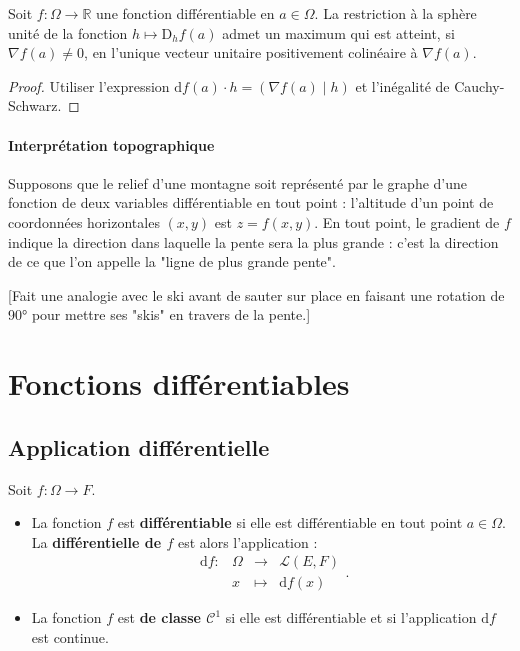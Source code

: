 \documentclass[french]{article}
\newcommand{\R}{\mathbb{R}}
\renewcommand{\d}{\text{d}}
\newcommand{\D}{\text{D}}
\theoremstyle{plain}
\theoremstyle{definition}
\theoremstyle{remark}
\begin{document}
\begin{prop}%
	Soit $f:\Omega\to\R$ une fonction différentiable en $a\in\Omega$. La restriction à la sphère unité de la fonction $h\mapsto \D_hf(a)$ admet un maximum qui est atteint, si $\nabla f(a)\ne0$, en l'unique vecteur unitaire positivement colinéaire à $\nabla f(a)$.
\end{prop}
\begin{proof}
	Utiliser l'expression $\d f(a)\cdot h=(\nabla f(a)\mid h)$ et l'inégalité de Cauchy-Schwarz.
\end{proof}

\paragraph{Interprétation topographique}
Supposons que le relief d'une montagne soit représenté par le graphe d'une fonction de deux variables différentiable en tout point : l'altitude d'un point de coordonnées horizontales $(x,y)$ est $z=f(x,y)$. En tout point, le gradient de $f$ indique la direction dans laquelle la pente sera la plus grande : c'est la direction de ce que l'on appelle la "ligne de plus grande pente".

[Fait une analogie avec le ski avant de sauter sur place en faisant une rotation de 90° pour mettre ses "skis" en travers de la pente.]

\section{Fonctions différentiables}

\subsection{Application différentielle}

\begin{dfn}
	Soit $f:\Omega\to F$.
	\begin{itemize}
		\item La fonction $f$ est \textbf{différentiable} si elle est différentiable en tout point $a\in\Omega$. La \textbf{différentielle de $f$} est alors l'application :
		$$\begin{array}{lrcl}
			\d f:&\Omega&\longrightarrow&\mathcal{L}(E,F)\\
			&x&\longmapsto&\d f(x)
		\end{array}.$$
		\item La fonction $f$ est \textbf{de classe $\mathcal{C}^1$} si elle est différentiable et si l'application $\d f$ est continue.
	\end{itemize}
\end{dfn}
\end{document}
